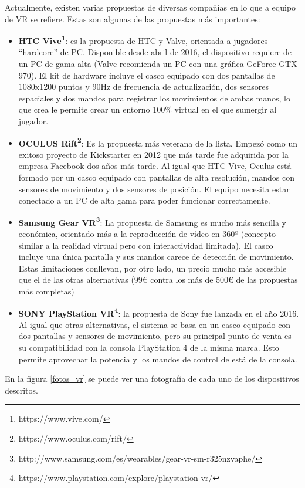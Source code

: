 Actualmente, existen varias propuestas de diversas compañías en lo que a equipo de VR se refiere. Estas son algunas de las propuestas más importantes:
\begin{itemize}
\item \textbf{HTC Vive\footnote{https://www.vive.com/}}: es la propuesta de HTC y Valve, orientada a jugadores ``hardcore'' de PC. Disponible desde abril de 2016, el dispositivo requiere de un PC de gama alta (Valve recomienda un PC con una gráfica GeForce GTX 970). El kit de hardware incluye el casco equipado con dos pantallas de 1080x1200 puntos y 90Hz de frecuencia de actualización, dos sensores espaciales y dos mandos para registrar los movimientos de ambas manos, lo que crea le permite crear un entorno 100\% virtual en el que sumergir al jugador.

\item \textbf{OCULUS Rift\footnote{https://www.oculus.com/rift/}}: Es la propuesta más veterana de la lista. Empezó como un exitoso proyecto de Kickstarter en 2012 que más tarde fue adquirida por la empresa Facebook dos años más tarde. Al igual que HTC Vive, Oculus está formado por un casco equipado con pantallas de alta resolución, mandos con sensores de movimiento y dos sensores de posición. El equipo necesita estar conectado a un PC de alta gama para poder funcionar correctamente.

\item \textbf{Samsung Gear VR\footnote{http://www.samsung.com/es/wearables/gear-vr-sm-r325nzvaphe/}}: La propuesta de Samsung es mucho más sencilla y económica, orientado más a la reproducción de vídeo en 360º (concepto similar a la realidad virtual pero con interactividad limitada). El casco incluye una única pantalla y sus mandos carece de detección de movimiento. Estas limitaciones conllevan, por otro lado, un precio mucho más accesible que el de las otras alternativas (99€ contra los más de 500€ de las propuestas más completas)

\item \textbf{SONY PlayStation VR\footnote{https://www.playstation.com/explore/playstation-vr/}}: la propuesta de Sony fue lanzada en el año 2016. Al igual que otras alternativas, el sistema se basa en un casco equipado con dos pantallas y sensores de movimiento, pero su principal punto de venta es su compatibilidad con la consola PlayStation 4 de la misma marca. Esto permite aprovechar la potencia y los mandos de control de está de la consola.
\end{itemize}
En la figura \ref{fotos_vr} se puede ver una fotografía de cada uno de los dispositivos descritos.
